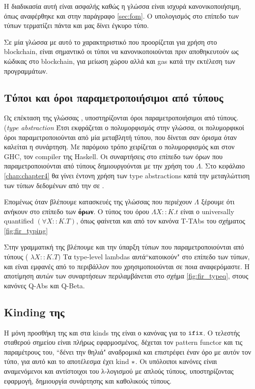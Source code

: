 Η διαδικασία αυτή είναι ασφαλής καθώς η γλώσσα \FOMF{} είναι ισχυρά κανονικοποιήσιμη, όπως αναφέρθηκε
και στην παράγραφο \ref{sec:fom}. Ο υπολογισμός στο επίπεδο των τύπων τερματίζει πάντα και μας δίνει
έγκυρο τύπο.

Σε μία γλώσσα με αυτό το χαρακτηριστικό που προορίζεται για χρήση στο blockchain, είναι σημαντικό
οι τύποι να κανονικοποιούνται πριν αποθηκευτούν ως κώδικας στο blockchain, για μείωση χώρου αλλά
και gas κατά την εκτέλεση των προγραμμάτων.



\subsection{Τύποι και όροι παραμετροποιήσιμοι από τύπους}

Ως επέκταση της γλώσσας \FOM, υποστηρίζονται όροι παραμετροποιήσιμοι από τύπους.
(\emph{type abstraction}
Έτσι εκφράζεται ο πολυμορφισμός στην γλώσσα, οι πολυμορφικοί όροι παραμετροποιούνται
από μία μεταβλητή τύπου, που δίνεται σαν όρισμα όταν καλείται η συνάρτηση. Με παρόμοιο
τρόπο χειρίζεται ο πολυμορφισμός και στον GHC, τον compiler της Haskell. Οι συναρτήσεις
στο επίπεδο των όρων που παραμετροποιούνται από τύπους δημιουργούνται με την χρήση
του $\Lambda$. Στο κεφάλαιο \ref{chap:chapter4} θα γίνει έντονη χρήση των type abstractions
κατά την μεταγλώττιση των τύπων δεδομένων από την \FIR{} σε \FOMF{}.


Επομένως όταν
βλέπουμε κατασκευές της γλώσσας που περιέχουν $\Lambda$ ξέρουμε ότι ανήκουν
στο επίπεδο των \textbf{όρων}. Ο τύπος του όρου $ \Lambda X :: K . t $ είναι ο universally
quantified $(\forall X::K.T)$, όπως φαίνεται και από τον κανόνα T-TAbs του σχήματος \ref{fig:fir_typing}

Στην γραμματική της \FOMF{} βλέπουμε και την ύπαρξη τύπων που παραμετροποιούνται από
τύπους ( $\lambda X :: K. T)$ Τα type-level lambdas αυτά``κατοικούν" στο επίπεδο των τύπων,
και είναι εμφανές από το περιβάλλον που χρησιμοποιούνται σε ποια αναφερόμαστε. Η αποτίμηση
αυτών των συναρτήσεων περιλαμβάνεται στο σχήμα \ref{fig:fir_typeq}, στους κανόνες Q-Abs και
Q-Beta.









\subsection{Kinding της \FOMF{}}
Η μόνη προσθήκη της \FOMF{} και \FIR{} στα kinds της \FOM{} είναι ο κανόνας
για το $\operatorname{\texttt{ifix}}$. Ο τελεστής σταθερού σημείου είναι πλήρως εφαρμοσμένος, δέχεται
τον pattern functor και τις παραμέτρους  του, ``δένει την θηλιά" αναδρομικά και επιστρέφει
έναν όρο με αυτόν τον τύπο, για αυτό και το αποτέλεσμα έχει kind $\operatorname{\ast}$. Οι υπόλοιποι
κανόνες είναι αναμενόμενοι και αντίστοιχοι του λ-λογισμού με απλούς τύπους, υποστηρίζοντας
εφαρμογή, δημιουργία συνάρτησης και καθολικούς τύπους.

\vspace{1cm}
